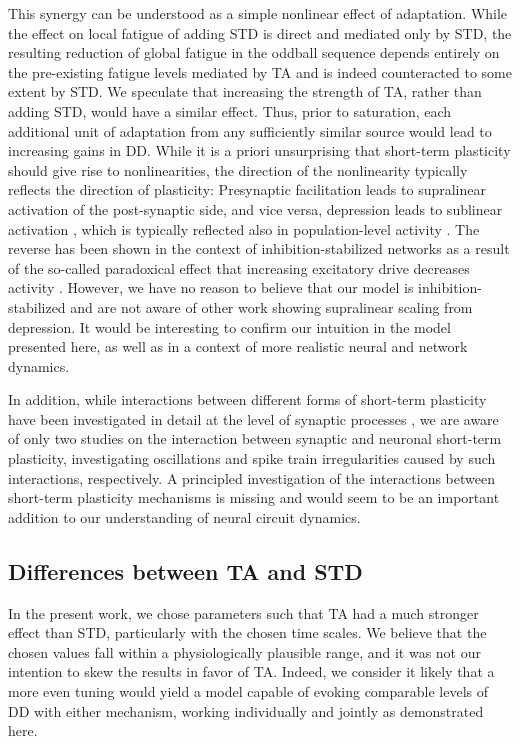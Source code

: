 \documentclass[9pt,lineno,onehalfspacing]{elife}
\begin{document}
This synergy can be understood as a simple nonlinear effect of adaptation. While the effect on local fatigue of adding STD is direct and mediated only by STD, the resulting reduction of global fatigue in the oddball sequence depends entirely on the pre-existing fatigue levels mediated by TA and is indeed counteracted to some extent by STD. We speculate that increasing the strength of TA, rather than adding STD, would have a similar effect. Thus, prior to saturation, each additional unit of adaptation from any sufficiently similar source would lead to increasing gains in DD. While it is a priori unsurprising that short-term plasticity should give rise to nonlinearities, the direction of the nonlinearity typically reflects the direction of plasticity: Presynaptic facilitation leads to supralinear activation of the post-synaptic side, and vice versa, depression leads to sublinear activation \citep{Tsodyks1997-qt, Varela1997-nr}, which is typically reflected also in population-level activity \citep{Tsodyks1998-bq}. The reverse has been shown in the context of inhibition-stabilized networks \citep{Wu2022-qx} as a result of the so-called paradoxical effect that increasing excitatory drive decreases activity \citep{Tsodyks1997-hr, Sanzeni2020-su}. However, we have no reason to believe that our model is inhibition-stabilized and are not aware of other work showing supralinear scaling from depression. It would be interesting to confirm our intuition in the model presented here, as well as in a context of more realistic neural and network dynamics.

In addition, while interactions between different forms of short-term plasticity have been investigated in detail at the level of synaptic processes \citep{Tsodyks1997-qt, Varela1997-nr, Buonomano1998-hf, Hennig2008-sc, Anwar2017-qg, Mondal2022-av}, we are aware of only two studies on the interaction between synaptic and neuronal short-term plasticity, investigating oscillations \citep{Mejias2011-rv} and spike train irregularities \citep{Ileri2015-eu} caused by such interactions, respectively. A principled investigation of the interactions between short-term plasticity mechanisms is missing and would seem to be an important addition to our understanding of neural circuit dynamics.

\subsection{Differences between TA and STD}

In the present work, we chose parameters such that TA had a much stronger effect than STD, particularly with the chosen time scales. We believe that the chosen values fall within a physiologically plausible range, and it was not our intention to skew the results in favor of TA. Indeed, we consider it likely that a more even tuning would yield a model capable of evoking comparable levels of DD with either mechanism, working individually and jointly as demonstrated here.
\end{document}
